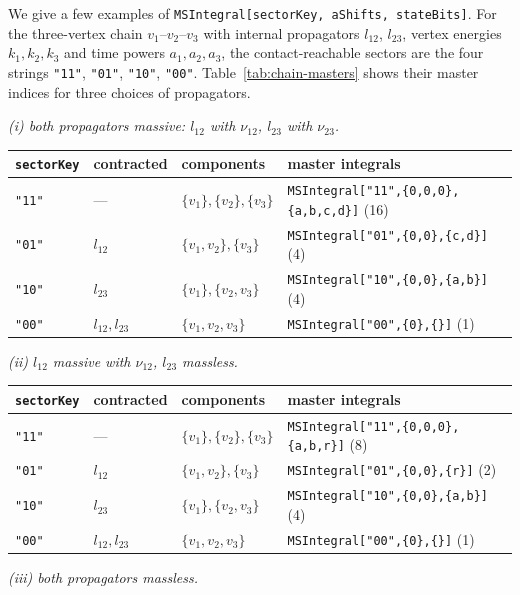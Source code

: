 \documentclass[11pt,a4paper]{article}
\numberwithin{table}{section}
\begin{document}
We give a few examples of \texttt{MSIntegral[sectorKey, aShifts, stateBits]}. For the three-vertex chain $v_1$--$v_2$--$v_3$ with internal propagators $l_{12}$, $l_{23}$, vertex
energies $k_1,k_2,k_3$ and time powers $a_1,a_2,a_3$, the contact-reachable sectors are the four
strings \texttt{"11"}, \texttt{"01"}, \texttt{"10"}, \texttt{"00"}. Table~\ref{tab:chain-masters}
shows their master indices for three choices of propagators.
\begin{table}[!htbp]
\centering
\emph{(i) both propagators massive: $l_{12}$ with $\nu_{12}$, $l_{23}$ with $\nu_{23}$.}\\[2pt]
\footnotesize\begin{tabular}{@{}lllp{5.8cm}@{}}
\toprule
\texttt{sectorKey} & contracted & components & master integrals\\
\midrule
\texttt{"11"} & --- & $\{v_1\},\{v_2\},\{v_3\}$
  & \texttt{MSIntegral["11",\{0,0,0\},\{a,b,c,d\}]} (16)\\
\texttt{"01"} & $l_{12}$ & $\{v_1,v_2\},\{v_3\}$
  & \texttt{MSIntegral["01",\{0,0\},\{c,d\}]} (4)\\
\texttt{"10"} & $l_{23}$ & $\{v_1\},\{v_2,v_3\}$
  & \texttt{MSIntegral["10",\{0,0\},\{a,b\}]} (4)\\
\texttt{"00"} & $l_{12},l_{23}$ & $\{v_1,v_2,v_3\}$
  & \texttt{MSIntegral["00",\{0\},\{\}]} (1)\\
\bottomrule
\end{tabular}
\par\medskip
\emph{(ii) $l_{12}$ massive with $\nu_{12}$, $l_{23}$ massless.}\\[2pt]
\footnotesize\begin{tabular}{@{}lllp{5.8cm}@{}}
\toprule
\texttt{sectorKey} & contracted & components & master integrals\\
\midrule
\texttt{"11"} & --- & $\{v_1\},\{v_2\},\{v_3\}$
  & \texttt{MSIntegral["11",\{0,0,0\},\{a,b,r\}]} (8)\\
\texttt{"01"} & $l_{12}$ & $\{v_1,v_2\},\{v_3\}$
  & \texttt{MSIntegral["01",\{0,0\},\{r\}]} (2)\\
\texttt{"10"} & $l_{23}$ & $\{v_1\},\{v_2,v_3\}$
  & \texttt{MSIntegral["10",\{0,0\},\{a,b\}]} (4)\\
\texttt{"00"} & $l_{12},l_{23}$ & $\{v_1,v_2,v_3\}$
  & \texttt{MSIntegral["00",\{0\},\{\}]} (1)\\
\bottomrule
\end{tabular}
\par\medskip
\emph{(iii) both propagators massless.}\\[2pt]

\end{table}
\end{document}
